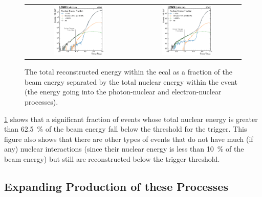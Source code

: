 \begin{figure}
  \centering
  \begin{tabular}{cc}
    \includegraphics[width=0.49\textwidth]{figures/ldmx/simulation/4gev-ecal-by-nuc.pdf}
    &
    \includegraphics[width=0.49\textwidth]{figures/ldmx/simulation/8gev-ecal-by-nuc.pdf}
  \end{tabular}
  \caption{The total reconstructed energy within the \ac{ecal} as a fraction of the beam energy
  separated by the total nuclear energy within the event (the energy going into the photon-nuclear
  and electron-nuclear processes).}
  \label{fig:rec-efrac-by-nuc}
\end{figure}

\cref{fig:rec-efrac-by-nuc} shows that a significant fraction of events whose total nuclear
energy is greater than \qty{62.5}{\percent} of the beam energy fall below the threshold for
the trigger.
This figure also shows that there are other types of events that do not have much (if any)
nuclear interactions (since their nuclear energy is less than \qty{10}{\percent} of the beam
energy) but still are reconstructed below the trigger threshold.

\subsection{Expanding Production of these Processes}

